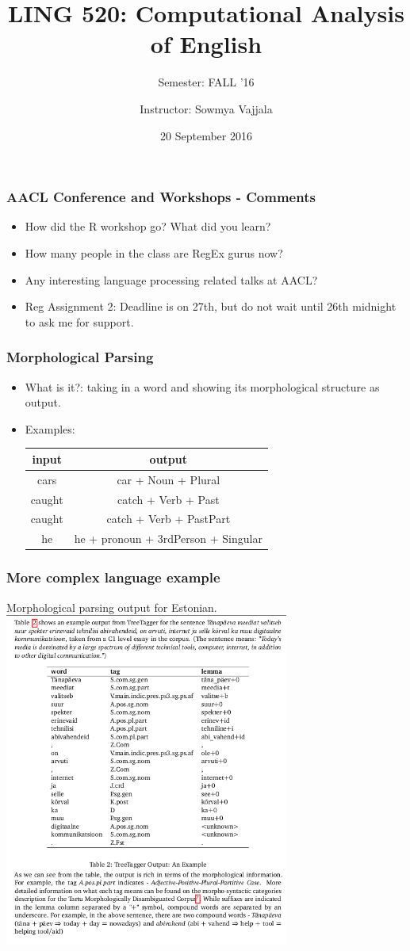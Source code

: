 \documentclass{beamer}
\author[Sowmya Vajjala]{Instructor: Sowmya Vajjala}
\title[LING 520]{LING 520: Computational Analysis of English}
\subtitle{Semester: FALL '16}
\date{20 September 2016}
\institute{Iowa State University, USA}
\begin{document}
\begin{frame}\titlepage
\end{frame}

\begin{frame}
\frametitle{AACL Conference and Workshops - Comments}
\begin{itemize}
\item How did the R workshop go? What did you learn? \pause
\item How many people in the class are RegEx gurus now? \pause
\item Any interesting language processing related talks at AACL? \pause
\item Reg Assignment 2: Deadline is on 27th, but do not wait until 26th midnight to ask me for support.
\end{itemize}
\end{frame}

\begin{frame}
\frametitle{Morphological Parsing}
\begin{itemize}
\item What is it?: taking in a word and showing its morphological structure as output. \pause
\item Examples: 
\begin{tabular}{c|c}
input & output \\
\hline
cars & car + Noun + Plural \\
caught & catch + Verb + Past \\
caught & catch + Verb + PastPart \\
he & he + pronoun + 3rdPerson + Singular \\
\end{tabular}
\end{itemize}
\end{frame}

\begin{frame}
\frametitle{More complex language example}
Morphological parsing output for Estonian.
\includegraphics[width=0.7\textwidth]{morphparsingexample.png}
\end{frame}
\end{document}
